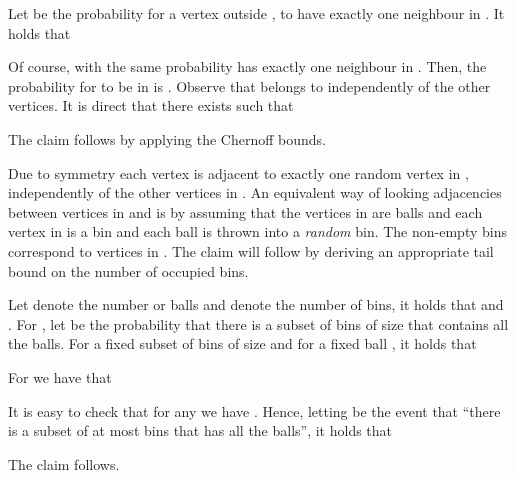 \documentclass[a4paper,10pt]{article}
\makeatletter
\newenvironment{claimproof}[1]{\noindent{\bf Proof of Claim #1\@:}}{\hfill \\}
\makeatother
\begin{document}
\begin{claimproof}{\ref{claim:Q1Claim}}
Let  be the probability for a vertex  outside ,
to have exactly one neighbour in . It holds
that 

Of course, with the same probability   has exactly one neighbour
in . Then, the probability for  to be in 
 is . Observe that  belongs
to  independently of the other vertices.
It is direct that there exists
 such that 

The claim follows by applying the Chernoff bounds.
\end{claimproof}




\begin{claimproof}{\ref{claim:Q2Claim}}
Due to symmetry each vertex  is adjacent to
exactly one random vertex in , independently
of the other vertices in . An equivalent way of
looking adjacencies between vertices in  and
 is by assuming that the vertices in
 are balls and each vertex in  is a bin and each ball is thrown into a {\em random} bin.
The non-empty bins correspond to vertices in . The
claim will follow by deriving an appropriate tail bound on the
number of occupied bins.

Let  denote the number or balls and  denote the number of
bins, it holds that  and .
For , let  be the probability that there is a
subset of bins of size  that contains all the balls. For 
a fixed subset of bins of size  and for a fixed ball , it
holds that

For  we have that

It is easy to check that for any  we have . Hence, letting  be the event that ``there is a 
subset of at most  bins that has all the balls'', it
holds that

The claim follows.
\end{claimproof}
\end{document}
